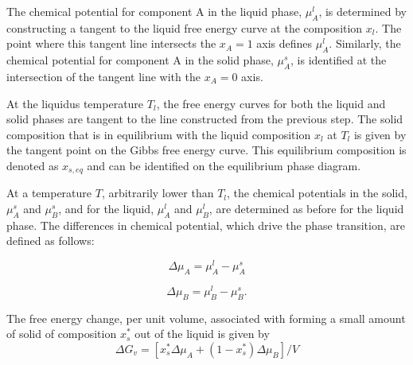 The chemical potential for component A in the liquid phase, \(\mu_A^l\), is determined by constructing a tangent to the liquid free energy curve at the composition \(x_l\). The point where this tangent line intersects the \(x_A = 1\) axis defines \(\mu_A^l\). Similarly, the chemical potential for component A in the solid phase, \(\mu_A^s\), is identified at the intersection of the tangent line with the \(x_A = 0\) axis.

At the liquidus temperature \(T_l\), the free energy curves for both the liquid and solid phases are tangent to the line constructed from the previous step. The solid composition that is in equilibrium with the liquid composition \(x_l\) at \(T_l\) is given by the tangent point on the Gibbs free energy curve. This equilibrium composition is denoted as \(x_{s,eq}\) and can be identified on the equilibrium phase diagram.

At a temperature \(T\), arbitrarily lower than \(T_l\), the chemical potentials in the solid, \(\mu_A^s\) and \(\mu_B^s\), and for the liquid, \(\mu_A^l\) and \(\mu_B^l\), are determined as before for the liquid phase. The differences in chemical potential, which drive the phase transition, are defined as follows:

\begin{equation}
\Delta\mu_A = \mu_A^l - \mu_A^s \label{eq:delta_mu_A}
\end{equation} 

\begin{equation}
\Delta\mu_B = \mu_B^l - \mu_B^s. \label{eq:delta_mu_B}
\end{equation} 

The free energy change, per unit volume, associated with forming a small amount of solid of composition \(x_{s}^\ast\) out of the liquid is given by
\begin{equation}
\Delta G_v = [x_s^\ast \Delta\mu_A + (1 - x_s^\ast) \Delta\mu_B]/V \label{eq:delta_G_v}
\end{equation} 

